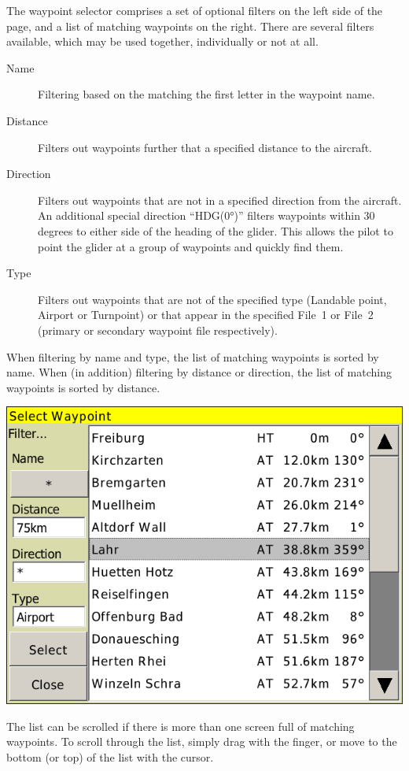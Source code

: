 The waypoint selector comprises a set of optional filters on the left
side of the page, and a list of matching waypoints on the right.
There are several filters available, which may be used together,
individually or not at all.
\begin{description}
\item[Name] Filtering based on the matching the first letter in the waypoint name. 
\item[Distance] Filters out waypoints further that a specified distance to the aircraft.
\item[Direction] Filters out waypoints that are not in a specified direction from the aircraft. 
   An additional special direction ``HDG(0°)'' filters waypoints within 30
   degrees to either side of the heading of the glider.  This allows the pilot to point the glider at a group of
  waypoints and quickly find them.
\item[Type] Filters out waypoints that are not of the specified type
(Landable point, Airport or Turnpoint) or that appear in the specified File~1 or
File~2 (primary or secondary waypoint file respectively).
\end{description}
When filtering by name and type, the list of matching waypoints is
sorted by name. When (in addition) filtering by distance or direction,
 the list of matching waypoints is sorted by distance.

\begin{center}
\includegraphics[angle=0,width=0.8\linewidth,keepaspectratio='true']{figures/dialog-waypointselect.png}
\end{center}

The list can be scrolled if there is more than one screen full of
matching waypoints.  To scroll through the list, simply drag with the finger, or
move to the bottom (or top) of the list with the cursor.   

